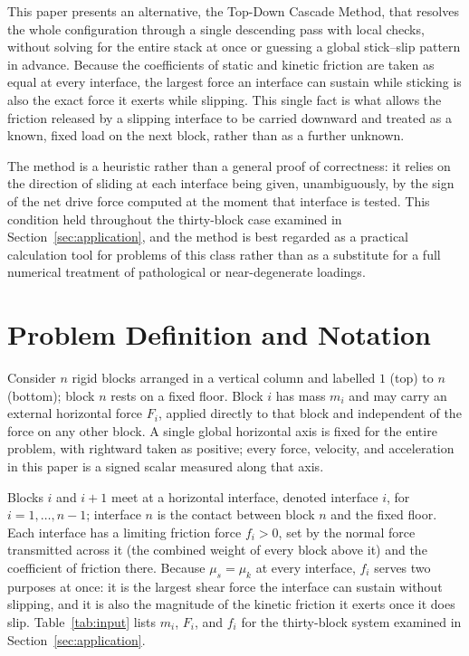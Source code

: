\documentclass[11pt,a4paper]{article}
\begin{document}
This paper presents an alternative, the Top-Down Cascade Method, that resolves the whole configuration through a single descending pass with local checks, without solving for the entire stack at once or guessing a global stick--slip pattern in advance. Because the coefficients of static and kinetic friction are taken as equal at every interface, the largest force an interface can sustain while sticking is also the exact force it exerts while slipping. This single fact is what allows the friction released by a slipping interface to be carried downward and treated as a known, fixed load on the next block, rather than as a further unknown.

The method is a heuristic rather than a general proof of correctness: it relies on the direction of sliding at each interface being given, unambiguously, by the sign of the net drive force computed at the moment that interface is tested. This condition held throughout the thirty-block case examined in Section~\ref{sec:application}, and the method is best regarded as a practical calculation tool for problems of this class rather than as a substitute for a full numerical treatment of pathological or near-degenerate loadings.

\section{Problem Definition and Notation}
\label{sec:problem}

Consider $n$ rigid blocks arranged in a vertical column and labelled $1$ (top) to $n$ (bottom); block $n$ rests on a fixed floor. Block $i$ has mass $m_i$ and may carry an external horizontal force $F_i$, applied directly to that block and independent of the force on any other block. A single global horizontal axis is fixed for the entire problem, with rightward taken as positive; every force, velocity, and acceleration in this paper is a signed scalar measured along that axis.

Blocks $i$ and $i+1$ meet at a horizontal interface, denoted interface $i$, for $i = 1, \dots, n-1$; interface $n$ is the contact between block $n$ and the fixed floor. Each interface has a limiting friction force $f_i > 0$, set by the normal force transmitted across it (the combined weight of every block above it) and the coefficient of friction there. Because $\mu_s = \mu_k$ at every interface, $f_i$ serves two purposes at once: it is the largest shear force the interface can sustain without slipping, and it is also the magnitude of the kinetic friction it exerts once it does slip. Table~\ref{tab:input} lists $m_i$, $F_i$, and $f_i$ for the thirty-block system examined in Section~\ref{sec:application}.
\end{document}
